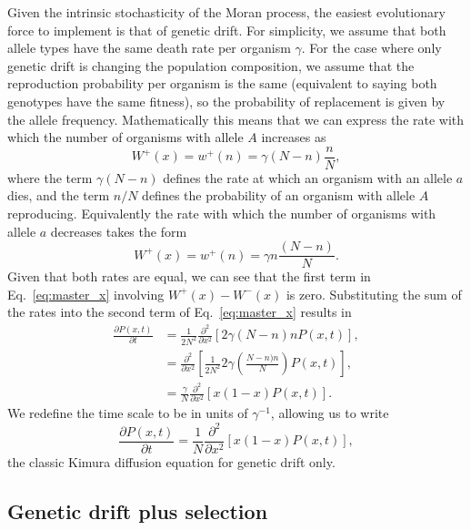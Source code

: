 Given the intrinsic stochasticity of the Moran process, the easiest evolutionary
force to implement is that of genetic drift. For simplicity, we assume that both
allele types have the same death rate per organism $\gamma$. For the case where
only genetic drift is changing the population composition, we assume that the
reproduction probability per organism is the same (equivalent to saying both
genotypes have the same fitness), so the probability of replacement is given by
the allele frequency. Mathematically this means that we can express the rate
with which the number of organisms with allele $A$ increases as
\begin{equation}
    W^+(x) = w^+(n) = \gamma (N-n) \frac{n}{N},
\end{equation}
where the term $\gamma (N-n)$ defines the rate at which an organism with an
allele $a$ dies, and the term $n/N$ defines the probability of an organism with
allele $A$ reproducing. Equivalently the rate with which the number of organisms
with allele $a$ decreases takes the form
\begin{equation}
    W^+(x) = w^+(n) = \gamma n \frac{(N-n)}{N}.
\end{equation}
Given that both rates are equal, we can see that the first term in
Eq.~\ref{eq:master_x} involving $W^+(x) - W^-(x)$ is zero. Substituting the sum
of the rates into the second term of Eq.~\ref{eq:master_x} results in
\begin{equation}
\begin{aligned}
    \frac{\partial P(x, t)}{\partial t} &=\frac{1}{2 N^{2}} 
    \frac{\partial^{2}}{\partial x^{2}}[2 \gamma(N-n) n P(x, t)], \\
    &=\frac{\partial^{2}}{\partial x^{2}}
    \left[\frac{1}{2 N^{2}} 2 \gamma\left(\frac{N-n) n}{N} \right) P(x, t)\right],\\
    &=\frac{\gamma}{N} \frac{\partial^{2}}{\partial x^{2}}[x(1-x) P(x, t)].
\end{aligned}
\end{equation}
We redefine the time scale to be in units of $\gamma^{-1}$, allowing us to write
\begin{equation}
    \frac{\partial P(x, t)}{\partial t} =
    \frac{1}{N} \frac{\partial^{2}}{\partial x^{2}}[x(1-x) P(x, t)],
\end{equation}
the classic Kimura diffusion equation for genetic drift only.

\subsection{Genetic drift plus selection}

